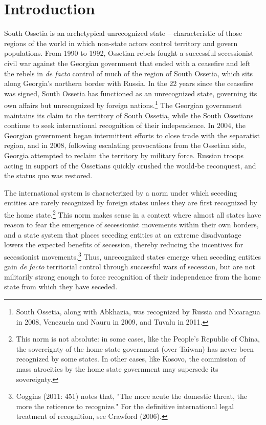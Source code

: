\documentclass[11pt,letterpaper, notitlepage]{article}
\begin{document}
\section{Introduction}
South Ossetia is an archetypical unrecognized state -- characteristic of those regions of the world in which non-state actors control territory and govern populations. From 1990 to 1992, Ossetian rebels fought a successful secessionist civil war against the Georgian government that ended with a ceasefire and left the rebels in \textit{de facto} control of much of the region of South Ossetia, which sits along Georgia's northern border with Russia. In the 22 years since the ceasefire was signed, South Ossetia has functioned as an unrecognized state, governing its own affairs but unrecognized by foreign nations.\footnote{South Ossetia, along with Abkhazia, was recognized by Russia and Nicaragua in 2008, Venezuela and Nauru in 2009, and Tuvalu in 2011.} The Georgian government maintains its claim to the territory of South Ossetia, while the South Ossetians continue to seek international recognition of their independence. In 2004, the Georgian government began intermittent efforts to close trade with the separatist region, and in 2008, following escalating provocations from the Ossetian side, Georgia attempted to reclaim the territory by military force. Russian troops acting in support of the Ossetians quickly crushed the would-be reconquest, and the status quo was restored.%

The international system is characterized by a norm under which seceding entities are rarely recognized by foreign states unless they are first recognized by the home state.\footnote{This norm is not absolute: in some cases, like the People's Republic of China, the sovereignty of the home state government (over Taiwan) has never been recognized by some states. In other cases, like Kosovo, the commission of mass atrocities by the home state government may supersede its sovereignty.} This norm makes sense in a context where almost all states have reason to fear the emergence of secessionist movements within their own borders, and a state system that places seceding entities at an extreme disadvantage lowers the expected benefits of secession, thereby reducing the incentives for secessionist movements.\footnote{Coggins (2011: 451) notes that, "The more acute the domestic threat, the more the reticence to recognize." For the definitive international legal treatment of recognition, see Crawford (2006).} Thus, unrecognized states emerge when seceding entities gain \emph{de facto} territorial control through successful wars of secession, but are not militarily strong enough to force recognition of their independence from the home state from which they have seceded.
\end{document}

